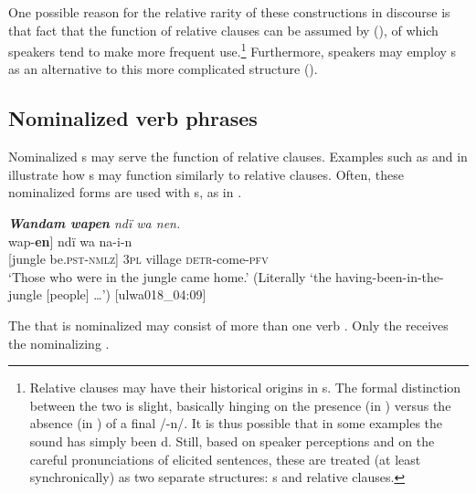One possible reason for the relative rarity of these constructions in discourse is that fact that the  function of relative clauses can be assumed by  (), of which speakers tend to make more frequent use.\footnote{Relative clauses may have their historical origins in s. The formal distinction between the two is slight, basically hinging on the presence (in ) versus the absence (in ) of a final /-n/. It is thus possible that in some examples the sound has simply been d. Still, based on speaker perceptions and on the careful pronunciations of elicited sentences, these are treated (at least synchronically) as two separate structures: s and relative clauses.} Furthermore, speakers may employ s as an alternative to this more complicated  structure ().


\subsection{Nominalized verb phrases}\label{sec:12.3.1}



Nominalized s may serve the  function of relative clauses. Examples such as  and  in  illustrate how s may function similarly to relative clauses. Often, these nominalized forms are used with s, as in .


\ea%
    \label{ex:complex:97}
        \textit{\textbf{Wandam wapen} ndï wa nen.}\\
\gll    {[wandam}  {wap-\textbf{en}]}    ndï  wa    na-i-n\\
    {[jungle}    be.\textsc{pst-nmlz]}  \textsc{3pl}  village  \textsc{detr}{}-come-\textsc{pfv}\\
\glt `Those who were in the jungle came home.’ (Literally ‘the having-been-in-the-jungle [people] …’) [ulwa018\_04:09]
\z

The  that is nominalized may consist of more than one verb . Only the  receives the nominalizing .

